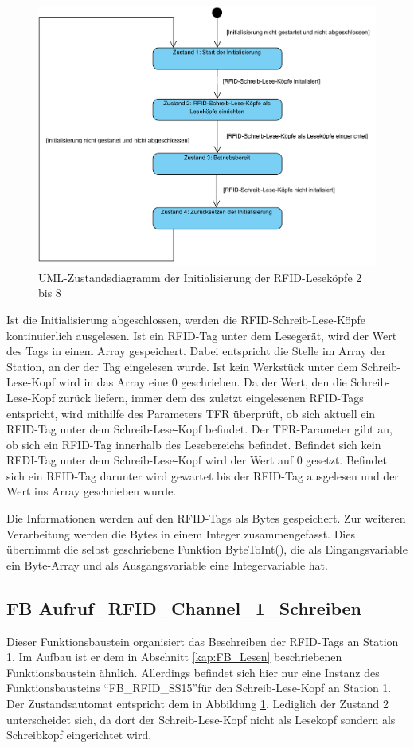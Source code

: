 \begin{figure}[h]
	    \centering
	    \includegraphics[width=0.7\linewidth]{Bilder/Zustandsdiagramme/RFID_lesen.png}
        \caption{UML-Zustandsdiagramm der Initialisierung der RFID-Leseköpfe 2 bis 8}
        \label{fig:init_Leseköpfe}
\end{figure}

Ist die Initialisierung abgeschlossen, werden die RFID-Schreib-Lese-Köpfe kontinuierlich ausgelesen. Ist ein RFID-Tag unter dem Lesegerät, wird der Wert des Tags in einem Array gespeichert. Dabei entspricht die Stelle im Array der Station, an der der Tag eingelesen wurde. Ist kein Werkstück unter dem Schreib-Lese-Kopf wird in das Array eine 0 geschrieben. Da der Wert, den die Schreib-Lese-Kopf zurück liefern, immer dem des zuletzt eingelesenen RFID-Tags entspricht, wird mithilfe des Parameters TFR überprüft, ob sich aktuell ein RFID-Tag unter dem Schreib-Lese-Kopf befindet. Der TFR-Parameter gibt an, ob sich ein RFID-Tag innerhalb des Lesebereichs befindet. Befindet sich kein RFDI-Tag unter dem Schreib-Lese-Kopf wird der Wert auf 0 gesetzt. Befindet sich ein RFID-Tag darunter wird gewartet bis der RFID-Tag ausgelesen und der Wert ins Array geschrieben wurde. 

Die Informationen werden auf den RFID-Tags als Bytes gespeichert. Zur weiteren Verarbeitung werden die Bytes in einem Integer zusammengefasst. Dies übernimmt die selbst geschriebene Funktion ByteToInt(), die als Eingangsvariable ein Byte-Array und als Ausgangsvariable eine Integervariable hat.

\subsection{FB Aufruf\_RFID\_Channel\_1\_Schreiben}\label{kap:FB_schreiben}
Dieser Funktionsbaustein organisiert das Beschreiben der RFID-Tags an Station 1. Im Aufbau ist er dem in Abschnitt \ref{kap:FB_Lesen} beschriebenen Funktionsbaustein ähnlich. Allerdings befindet sich hier nur eine Instanz des Funktionsbausteins "`FB\_RFID\_SS15"'für den Schreib-Lese-Kopf an Station 1. Der Zustandsautomat entspricht dem in Abbildung \ref{fig:init_Leseköpfe}. Lediglich der Zustand 2 unterscheidet sich, da dort der Schreib-Lese-Kopf nicht als Lesekopf sondern als Schreibkopf eingerichtet wird. 

